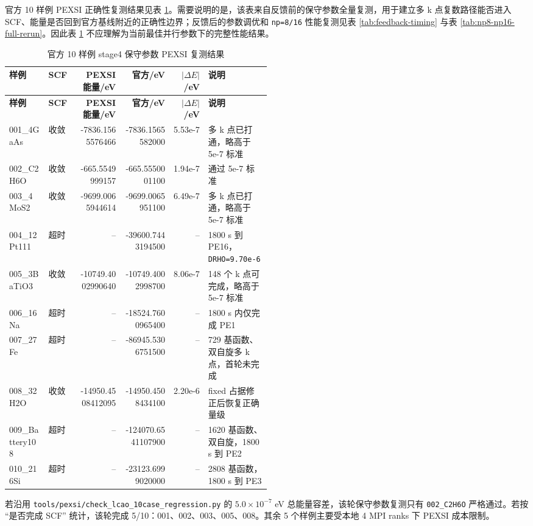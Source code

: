 \documentclass[a4paper,11pt]{article}
\newcommand{\code}[1]{\texttt{#1}}
\begin{document}
官方 10 样例 PEXSI 正确性复测结果见表 \ref{tab:pexsi-10case-result}。需要说明的是，该表来自反馈前的保守参数全量复测，用于建立多 k 点复数路径能否进入 SCF、能量是否回到官方基线附近的正确性边界；反馈后的参数调优和 \code{np=8/16} 性能复测见表 \ref{tab:feedback-timing} 与表 \ref{tab:np8-np16-full-rerun}。因此表 \ref{tab:pexsi-10case-result} 不应理解为当前最佳并行参数下的完整性能结果。

{\scriptsize
\begin{longtable}{@{}p{0.15\linewidth}p{0.11\linewidth}r r r p{0.24\linewidth}@{}}
\caption{官方 10 样例 stage4 保守参数 PEXSI 复测结果}
\label{tab:pexsi-10case-result}\\
\toprule
\textbf{样例} & \textbf{SCF} & \textbf{PEXSI 能量/eV} & \textbf{官方/eV} & \textbf{\(|\Delta E|\)/eV} & \textbf{说明}\\
\midrule
\endfirsthead
\toprule
\textbf{样例} & \textbf{SCF} & \textbf{PEXSI 能量/eV} & \textbf{官方/eV} & \textbf{\(|\Delta E|\)/eV} & \textbf{说明}\\
\midrule
\endhead
001\_4GaAs & 收敛 & -7836.1565576466 & -7836.1565582000 & 5.53e-7 & 多 k 点已打通，略高于 5e-7 标准\\
002\_C2H6O & 收敛 & -665.5549999157 & -665.5550001100 & 1.94e-7 & 通过 5e-7 标准\\
003\_4MoS2 & 收敛 & -9699.0065944614 & -9699.0065951100 & 6.49e-7 & 多 k 点已打通，略高于 5e-7 标准\\
004\_12Pt111 & 超时 & -- & -39600.7443194500 & -- & 1800 s 到 PE16，\code{DRHO=9.70e-6}\\
005\_3BaTiO3 & 收敛 & -10749.4002990640 & -10749.4002998700 & 8.06e-7 & 148 个 k 点可完成，略高于 5e-7 标准\\
006\_16Na & 超时 & -- & -18524.7600965400 & -- & 1800 s 内仅完成 PE1\\
007\_27Fe & 超时 & -- & -86945.5306751500 & -- & 729 基函数、双自旋多 k 点，首轮未完成\\
008\_32H2O & 收敛 & -14950.4508412095 & -14950.4508434100 & 2.20e-6 & fixed 占据修正后恢复正确量级\\
009\_Battery108 & 超时 & -- & -124070.6541107900 & -- & 1620 基函数、双自旋，1800 s 到 PE2\\
010\_216Si & 超时 & -- & -23123.6999020000 & -- & 2808 基函数，1800 s 到 PE3\\
\bottomrule
\end{longtable}
}

若沿用 \code{tools/pexsi/check\_lcao\_10case\_regression.py} 的 \(5.0\times10^{-7}\) eV 总能量容差，该轮保守参数复测只有 \code{002\_C2H6O} 严格通过。若按 ``是否完成 SCF'' 统计，该轮完成 5/10：001、002、003、005、008。其余 5 个样例主要受本地 4 MPI ranks 下 PEXSI 成本限制。
\end{document}
